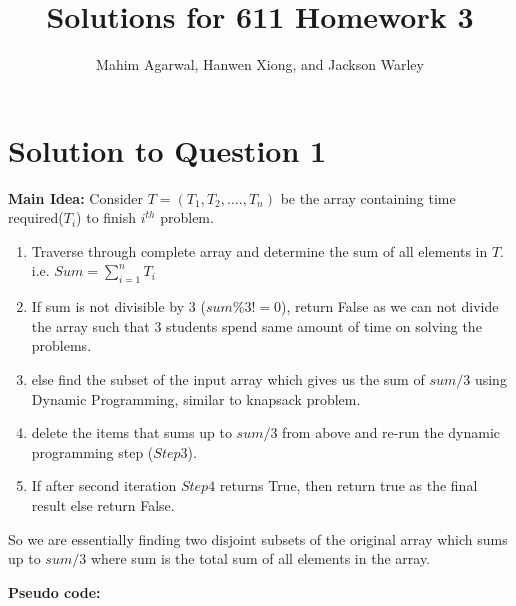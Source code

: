 \documentclass[11pt]{article}
\title{Solutions for 611 Homework 3}
\author{Mahim Agarwal, Hanwen Xiong, and Jackson Warley}
\begin{document}
\maketitle

\section{Solution to Question 1}
	
\textbf{Main Idea:}
Consider $T = (T_1, T_2, ...., T_n)$ be the array containing time required($T_i$) to finish $i^{th}$ problem. \\
\begin{enumerate}
	\item Traverse through complete array and  determine the sum of all elements in $T$. i.e. $Sum = \sum_{i=1}^{n} T_i$
	\item If sum is not divisible by $3$ ($sum\%3 != 0$), return False as we can not divide the array such that $3$ students spend 
	same amount of time on solving the problems.
	\item else find the subset of the input array which gives us the sum of $sum/3$ using Dynamic Programming, similar to 
	knapsack problem.
	\item delete the items that sums up to $sum/3$ from above and re-run the dynamic programming step ($Step 3$).
	\item If after second iteration $Step 4$ returns True, then return true as the final result else return False.
\end{enumerate}
So we are essentially finding two disjoint subsets of the original array which sums up to $sum/3$ where sum is the total sum of 
all elements in the array.

\textbf{Pseudo code:}
\end{document}
